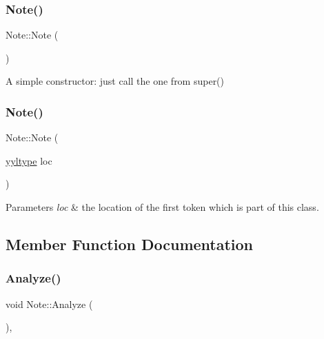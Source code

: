 \subsubsection{\texorpdfstring{Note()}{Note()}\hspace{0.1cm}{\footnotesize\ttfamily [1/2]}}
{\footnotesize\ttfamily Note\+::\+Note (\begin{DoxyParamCaption}{ }\end{DoxyParamCaption})\hspace{0.3cm}{\ttfamily [inline]}}

A simple constructor\+: just call the one from super() \mbox{\label{class_note_a3447549f2cbb503de5353cbcb848b37b}} 
\subsubsection{\texorpdfstring{Note()}{Note()}\hspace{0.1cm}{\footnotesize\ttfamily [2/2]}}
{\footnotesize\ttfamily Note\+::\+Note (\begin{DoxyParamCaption}\item[{\hyperlink{structyyltype}{yyltype}}]{loc }\end{DoxyParamCaption})\hspace{0.3cm}{\ttfamily [inline]}}


\begin{DoxyParams}{Parameters}
{\em loc} & the location of the first token which is part of this class. \\
\hline
\end{DoxyParams}


\subsection{Member Function Documentation}
\mbox{\label{class_note_a33934adfae6685ff299c6ee9a57fd1f5}} 
\subsubsection{\texorpdfstring{Analyze()}{Analyze()}}
{\footnotesize\ttfamily void Note\+::\+Analyze (\begin{DoxyParamCaption}{ }\end{DoxyParamCaption})\hspace{0.3cm}{\ttfamily [inline]}, {\ttfamily [virtual]}}

